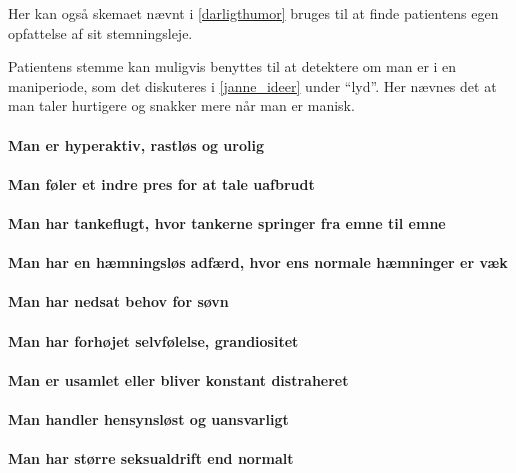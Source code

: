 Her kan også skemaet nævnt i \cref{darligthumor} bruges til at finde patientens egen opfattelse af sit stemningsleje.

Patientens stemme kan muligvis benyttes til at detektere om man er i en maniperiode, som det diskuteres i \cref{janne_ideer} under ``lyd''. 
Her nævnes det at man taler hurtigere og snakker mere når man er manisk.


\paragraph{Man er hyperaktiv, rastløs og urolig}


\paragraph{Man føler et indre pres for at tale uafbrudt}

\paragraph{Man har tankeflugt, hvor tankerne springer fra emne til emne}

\paragraph{Man har en hæmningsløs adfærd, hvor ens normale hæmninger er væk}

\paragraph{Man har nedsat behov for søvn}

\paragraph{Man har forhøjet selvfølelse, grandiositet}

\paragraph{Man er usamlet eller bliver konstant distraheret}

\paragraph{Man handler hensynsløst og uansvarligt}

\paragraph{Man har større seksualdrift end normalt}




